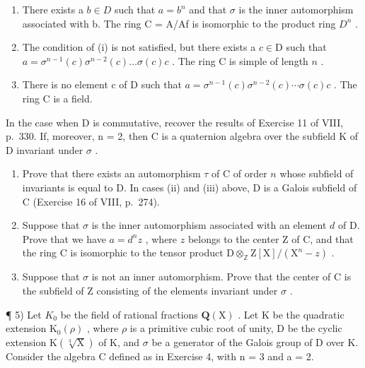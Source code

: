 \begin{enumerate}
\def\labelenumi{(\roman{enumi})}
\item
  There exists a \(b \in D\) such that \(a = b^{n}\) and that \(\sigma\) is the inner automorphism associated with b. The ring C = A/Af is isomorphic to the product ring \(D^{n}\) .
\item
  The condition of (i) is not satisfied, but there exists a \(c \in \mathrm{D}\) such that \(a = \sigma^{n-1}(c)\sigma^{n-2}(c)\ldots\sigma(c)c\) . The ring C is simple of length \(n\) .
\item
  There is no element c of D such that \(a = \sigma^{n-1}(c) \sigma^{n-2}(c) \cdots \sigma(c) c\) . The ring C is a field.
\end{enumerate}

In the case when D is commutative, recover the results of Exercise 11 of VIII, p.~330. If, moreover, n = 2, then C is a quaternion algebra over the subfield K of D invariant under \(\sigma\) .

\begin{enumerate}
\def\labelenumi{\alph{enumi})}
\setcounter{enumi}{3}
\item
  Prove that there exists an automorphism \(\tau\) of C of order \(n\) whose subfield of invariants is equal to D. In cases (ii) and (iii) above, D is a Galois subfield of C (Exercise 16 of VIII, p.~274).
\item
  Suppose that \(\sigma\) is the inner automorphism associated with an element \(d\) of D. Prove that we have \(a = d^n z\) , where \(z\) belongs to the center Z of C, and that the ring C is isomorphic to the tensor product \(\mathrm{D} \otimes_{\mathbb{Z}} \mathrm{Z}[\mathrm{X}] / (\mathrm{X}^n - z)\) .
\item
  Suppose that \(\sigma\) is not an inner automorphism. Prove that the center of C is the subfield of Z consisting of the elements invariant under \(\sigma\) .
\end{enumerate}

¶ 5) Let \(K_{0}\) be the field of rational fractions \(\mathbf{Q}(\mathrm{X})\) . Let K be the quadratic extension \(\mathrm{K}_{0}(\rho)\) , where \(\rho\) is a primitive cubic root of unity, D be the cyclic extension \(\mathrm{K}(\sqrt[3]{\mathrm{X}})\) of K, and \(\sigma\) be a generator of the Galois group of D over K. Consider the algebra C defined as in Exercise 4, with n = 3 and a = 2.


